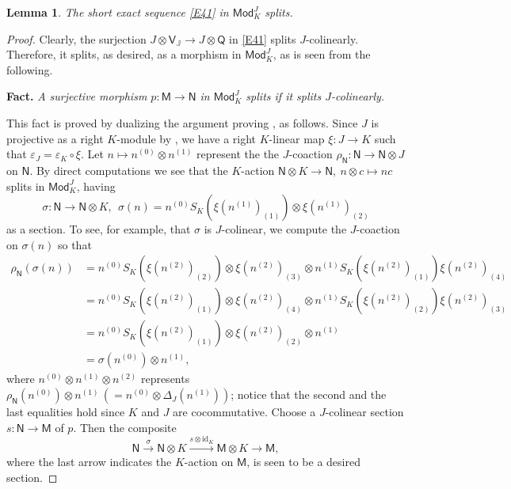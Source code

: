 \documentclass[11pt, a4paper]{amsart}
\newtheorem{lemma}[theorem]{Lemma}
\theoremstyle{definition}
\numberwithin{equation}{section}
\begin{document}
\begin{lemma}\label{L41}
The short exact sequence \eqref{E41} in $\mathsf{Mod}_{K}^{J}$ splits.
\end{lemma}
\begin{proof}
Clearly, the surjection $J \otimes \mathsf{V}_{\mathbb{J}} \to J \otimes \mathsf{Q}$ in \eqref{E41} splits $J$-colinearly.
Therefore, it splits, as desired, as a morphism in $\mathsf{Mod}_{K}^{J}$, as is seen from the following.
\medskip

\noindent
\textbf{Fact.}
\emph{A surjective morphism $p:\mathsf{M} \to \mathsf{N}$ in $\mathsf{Mod}_{K}^{J}$ splits if it splits $J$-colinearly.}
\medskip

This fact is proved by dualizing the argument proving \cite[Theorem 1]{D}, as follows.
Since $J$ is projective as a right $K$-module by \cite[Theorem 1.3]{M}, we have a right $K$-linear map 
$\xi: J \to K$ such that $\varepsilon_{J} =\varepsilon_{K} \circ \xi$.
Let $n \mapsto n^{(0)}\otimes n^{(1)}$ represent the the $J$-coaction $\rho_{\mathsf{N}} : \mathsf{N} \to \mathsf{N} \otimes J$ 
on $\mathsf{N}$.
By direct computations we see that 
the $K$-action $\mathsf{N} \otimes K \to \mathsf{N},\ n \otimes c \mapsto nc$ splits in $\mathsf{Mod}_{K}^{J}$, having
\[ \sigma: \mathsf{N} \to \mathsf{N} \otimes K,\ \ \sigma(n) = n^{(0)} S_{K}(\xi(n^{(1)})_{(1)}) \otimes \xi(n^{(1)})_{(2)} \]
as a section. To see, for example, that $\sigma$ is $J$-colinear, we compute the $J$-coaction on $\sigma(n)$ so that
\[
\begin{split}
\rho_{\mathsf{N}}(\sigma(n))&=n^{(0)} S_{K}(\xi(n^{(2)})_{(2)}) \otimes \xi(n^{(2)})_{(3)}\otimes n^{(1)}S_{K}(\xi(n^{(2)})_{(1)})\xi(n^{(2)})_{(4)}\\
&=n^{(0)} S_{K}(\xi(n^{(2)})_{(1)}) \otimes \xi(n^{(2)})_{(4)}\otimes n^{(1)} S_{K}(\xi(n^{(2)})_{(2)})\xi(n^{(2)})_{(3)}\\
&=n^{(0)} S_{K}(\xi(n^{(2)})_{(1)}) \otimes \xi(n^{(2)})_{(2)}\otimes n^{(1)}\\
&=\sigma(n^{(0)})\otimes n^{(1)},
\end{split}
\]
where $n^{(0)}\otimes n^{(1)}\otimes n^{(2)}$ represents $\rho_{\mathsf{N}}(n^{(0)})\otimes n^{(1)}\, 
(=n^{(0)}\otimes\Delta_J(n^{(1)}))$; notice that 
the second and the last equalities hold since $K$ and $J$ are cocommutative. 
Choose a $J$-colinear section $s: \mathsf{N} \to \mathsf{M}$ of $p$.
Then the composite
\[ \mathsf{N} \overset{\sigma}{\longrightarrow} \mathsf{N} \otimes K \xrightarrow{s \otimes \mathrm{id}_{K}} \mathsf{M} \otimes K \longrightarrow \mathsf{M}, \]
where the last arrow indicates the $K$-action on $\mathsf{M}$, is seen to be a desired section.
\end{proof}
\end{document}
